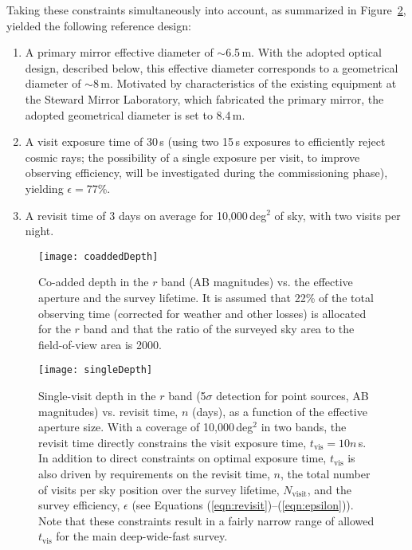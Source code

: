 Taking these constraints simultaneously into account, as summarized in
Figure~\ref{Fig:singleDepth},
yielded the following reference design:
\begin{enumerate}
\item A primary mirror effective diameter of $\sim$6.5\,m. With the adopted optical
design, described below, this effective diameter corresponds to a geometrical diameter
of $\sim$8\,m. Motivated by characteristics of the existing equipment at the
Steward Mirror Laboratory, which fabricated the primary mirror, the adopted
geometrical diameter is set to 8.4\,m.
\item A visit exposure time of 30\,s (using two 15\,s exposures
to efficiently reject cosmic rays; the possibility of a single exposure per visit,
to improve observing efficiency, will be investigated during the commissioning phase),
yielding $\epsilon=77$\%.
\item A revisit time of 3 days on average for 10,000\,deg$^2$ of sky,
  with two visits per night.
\end{enumerate}

\begin{figure}[t]
\texttt{[image: coaddedDepth]}
\caption{Co-added depth in the $r$ band (AB magnitudes) vs. the effective aperture and
the survey lifetime. It is assumed that 22\% of the total observing time (corrected for
weather and other losses) is allocated for the $r$ band and that the ratio of
the surveyed sky area to the field-of-view area is 2000.}
\label{Fig:coaddDepth}
\end{figure}

\begin{figure}[t]
\texttt{[image: singleDepth]}
\caption{Single-visit depth in the $r$ band (5$\sigma$ detection for
point sources, AB magnitudes) vs. revisit time, $n$ (days), as a function of
the effective aperture size. With a coverage of 10,000\,deg$^2$ in two bands,
the revisit time directly constrains the visit exposure time, $t_\mathrm{vis}=10n$\,s.
In addition to direct constraints on optimal exposure time, $t_\mathrm{vis}$
is also driven by requirements on the revisit time, $n$, the total number of visits
per sky position over the survey lifetime, $N_\mathrm{visit}$, and the survey efficiency,
$\epsilon$ (see Equations (\ref{eqn:revisit})--(\ref{eqn:epsilon})). Note that these constraints result in a fairly narrow range of
allowed $t_\mathrm{vis}$ for the main deep-wide-fast survey.}
\label{Fig:singleDepth}
\end{figure}


